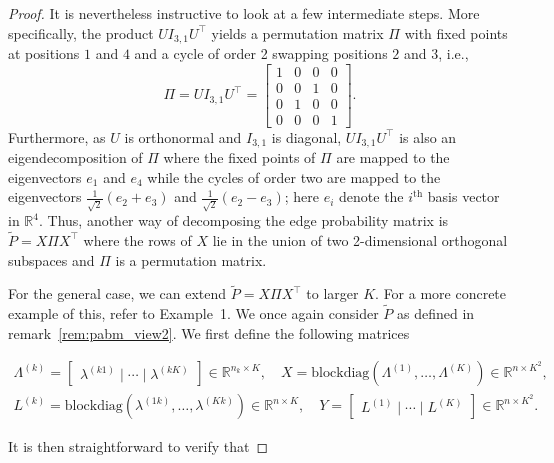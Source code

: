 \documentclass[
  11pt,
]{article}
\theoremstyle{definition}
\theoremstyle{definition}
\theoremstyle{definition}
\theoremstyle{definition}
\theoremstyle{remark}
\begin{document}
\begin{proof}
It is nevertheless instructive to look at a few intermediate steps. 
More specifically, the product $U I_{3, 1} U^\top$ 
yields a permutation matrix $\Pi$ with fixed points at positions $1$ and $4$ 
and a cycle of order 2 swapping positions $2$ and $3$, i.e., 
$$\Pi = U I_{3, 1} U^\top = \begin{bmatrix} 1 & 0 & 0 & 0 \\
  0 & 0 & 1 & 0 \\
  0 & 1 & 0 & 0 \\
  0 & 0 & 0 & 1
\end{bmatrix}.$$
Furthermore, as $U$ is orthonormal and $I_{3, 1}$ is diagonal, 
$U I_{3, 1} U^\top$ is also an eigendecomposition of $\Pi$ where the fixed
points of $\Pi$ are mapped to the eigenvectors $e_1$ and $e_4$
while the cycles of order two are mapped to the eigenvectors  
$\tfrac{1}{\sqrt{2}}(e_{2} + e_3)$ and $\tfrac{1}{\sqrt{2}}(e_{2} -
e_3)$; here $e_i$ denote the $i^\mathrm{th}$ basis vector in $\mathbb{R}^{4}$. 
Thus, another way of decomposing the edge probability matrix is
$\tilde{P} = X \Pi X^\top$ where the rows of $X$ lie in the union of
two 2-dimensional orthogonal subspaces and $\Pi$ is a permutation matrix. 

For the general case, we can extend $\tilde{P} = X \Pi X^\top$ to larger $K$. 
For a more concrete example of this, refer to Example~1. 
We once again consider $\tilde{P}$ as defined in
remark~\ref{rem:pabm_view2}.  
We first define the following matrices

\begin{gather}
\label{eq:xy}
\Lambda^{(k)} = \begin{bmatrix} \lambda^{(k1)} \mid \cdots \mid \lambda^{(kK)} \end{bmatrix}
\in \mathbb{R}^{n_k \times K}, \quad
X = \mathrm{blockdiag}(\Lambda^{(1)}, \dots, \Lambda^{(K)}) \in
\mathbb{R}^{n \times K^2}, \\
L^{(k)} = \mathrm{blockdiag}(\lambda^{(1k)}, \dots, \lambda^{(Kk)}) \in
\mathbb{R}^{n \times K}, \quad
Y = \begin{bmatrix} L^{(1)} \mid \cdots \mid L^{(K)} \end{bmatrix} \in
\mathbb{R}^{n \times K^2}.
\end{gather}

It is then straightforward to verify that


\end{proof}
\end{document}
